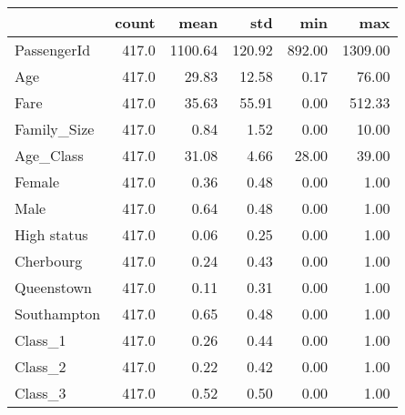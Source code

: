 \begin{tabular}{lrrrrr}
\toprule
{} &  count &     mean &     std &     min &      max \\
\midrule
PassengerId &  417.0 &  1100.64 &  120.92 &  892.00 &  1309.00 \\
Age         &  417.0 &    29.83 &   12.58 &    0.17 &    76.00 \\
Fare        &  417.0 &    35.63 &   55.91 &    0.00 &   512.33 \\
Family\_Size &  417.0 &     0.84 &    1.52 &    0.00 &    10.00 \\
Age\_Class   &  417.0 &    31.08 &    4.66 &   28.00 &    39.00 \\
Female      &  417.0 &     0.36 &    0.48 &    0.00 &     1.00 \\
Male        &  417.0 &     0.64 &    0.48 &    0.00 &     1.00 \\
High status &  417.0 &     0.06 &    0.25 &    0.00 &     1.00 \\
Cherbourg   &  417.0 &     0.24 &    0.43 &    0.00 &     1.00 \\
Queenstown  &  417.0 &     0.11 &    0.31 &    0.00 &     1.00 \\
Southampton &  417.0 &     0.65 &    0.48 &    0.00 &     1.00 \\
Class\_1     &  417.0 &     0.26 &    0.44 &    0.00 &     1.00 \\
Class\_2     &  417.0 &     0.22 &    0.42 &    0.00 &     1.00 \\
Class\_3     &  417.0 &     0.52 &    0.50 &    0.00 &     1.00 \\
\bottomrule
\end{tabular}
